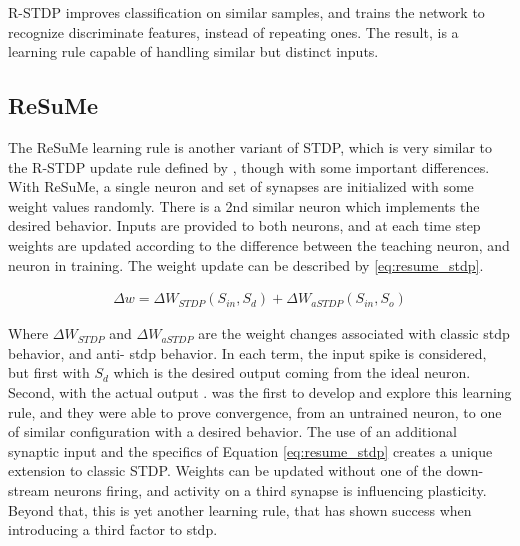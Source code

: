     R-STDP improves classification on similar samples, and trains the network to
    recognize discriminate features, instead of repeating ones. The result, is
    a learning rule capable of handling similar but distinct inputs.

    \subsection{ReSuMe}
    The ReSuMe learning rule is another variant of STDP, which is very similar
    to the R-STDP update rule defined by \parencite{mozafari_2018}, though with some
    important differences. With ReSuMe, a single neuron and set of synapses are
    initialized with some weight values randomly. There is a 2nd similar neuron
    which implements the desired behavior. Inputs are provided to both neurons,
    and at each time step weights are updated according to the difference
    between the teaching neuron, and neuron in training. The weight update can
    be described by \ref{eq:resume_stdp}.

    \begin{align}
      \Delta w = \Delta W_{STDP}(S_{in}, S_{d}) + \Delta W_{aSTDP}(S_{in}, S_{o}) \label{eq:resume_stdp}
    \end{align}

    Where $\Delta W_{STDP}$ and $\Delta W_{aSTDP}$ are the weight changes
    associated with classic \Gls{stdp} behavior, and anti- \Gls{stdp}
    behavior. In each term, the input spike is considered, but first with
    $S_{d}$ which is the desired output coming from the ideal neuron. Second,
    with the actual output \cite{mozafari_2018}. \parencite{ponulak_2010} was
    the first to develop and explore this learning rule, and they were able to
    prove convergence, from an untrained neuron, to one of similar configuration
    with a desired behavior. The use of an additional synaptic input and the
    specifics of Equation \ref{eq:resume_stdp} creates a unique extension to
    classic STDP. Weights can be updated without one of the down-stream neurons
    firing, and activity on a third synapse is influencing plasticity. Beyond
    that, this is yet another learning rule, that has shown success when
    introducing a third factor to \Gls{stdp}.

    
